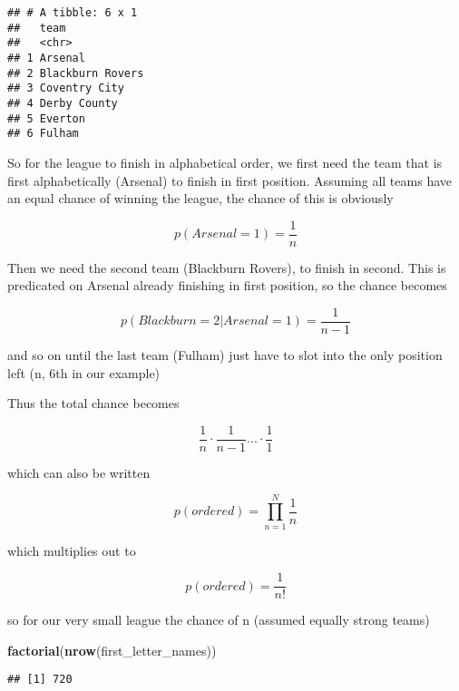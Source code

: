 \documentclass[]{article}
\newenvironment{Shaded}{\begin{snugshade}}{\end{snugshade}}
\newcommand{\KeywordTok}[1]{\textcolor[rgb]{0.13,0.29,0.53}{\textbf{#1}}}
\newcommand{\NormalTok}[1]{#1}
\begin{document}
\begin{verbatim}
## # A tibble: 6 x 1
##   team            
##   <chr>           
## 1 Arsenal         
## 2 Blackburn Rovers
## 3 Coventry City   
## 4 Derby County    
## 5 Everton         
## 6 Fulham
\end{verbatim}

So for the league to finish in alphabetical order, we first need the
team that is first alphabetically (Arsenal) to finish in first position.
Assuming all teams have an equal chance of winning the league, the
chance of this is obviously

\[ p(Arsenal = 1) =  \frac{1}{n}\]

Then we need the second team (Blackburn Rovers), to finish in second.
This is predicated on Arsenal already finishing in first position, so
the chance becomes

\[ p(Blackburn = 2 | Arsenal = 1) = \frac{1}{n-1} \]

and so on until the last team (Fulham) just have to slot into the only
position left (n, 6th in our example)

Thus the total chance becomes

\[ \frac{1}{n} \cdot \frac{1}{n-1} ... \cdot \frac{1}{1} \]

which can also be written

\[ p(ordered) = \prod_{n = 1}^{N} \frac{1}{n}\]

which multiplies out to

\[ p(ordered) = \frac{1}{n!} \]

so for our very small league the chance of n (assumed equally strong
teams)

\begin{Shaded}
\begin{Highlighting}[]
\KeywordTok{factorial}\NormalTok{(}\KeywordTok{nrow}\NormalTok{(first_letter_names))}
\end{Highlighting}
\end{Shaded}

\begin{verbatim}
## [1] 720
\end{verbatim}
\end{document}

